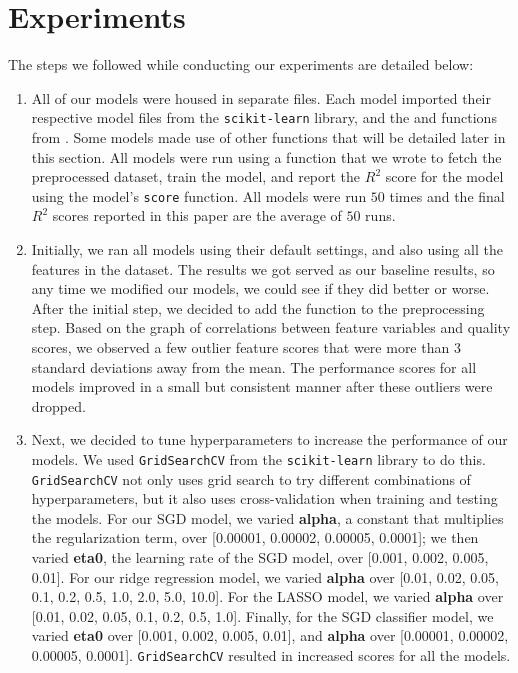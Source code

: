 
\newpage

\section{Experiments}
\label{sec:expts}

The steps we followed while conducting our experiments are detailed below:
\begin{enumerate}
    \item All of our models were housed in separate files. Each model imported their respective model files from the \texttt{scikit-learn} library, and the  and  functions from . Some models made use of other functions that will be detailed later in this section. All models were run using a  function that we wrote to fetch the preprocessed dataset, train the model, and report the $R^2$ score for the model using the model's \texttt{score} function. All models were run $50$ times and the final $R^2$ scores reported in this paper are the average of $50$ runs.
    \item Initially, we ran all models using their default settings, and also using all the features in the dataset. The results we got served as our baseline results, so any time we modified our models, we could see if they did better or worse. After the initial step, we decided to add the  function to the preprocessing step. Based on the graph of correlations between feature variables and quality scores, we observed a few outlier feature scores that were more than $3$ standard deviations away from the mean. The performance scores for all models improved in a small but consistent manner after these outliers were dropped.
    \item Next, we decided to tune hyperparameters to increase the performance of our models. We used \texttt{GridSearchCV} from the \texttt{scikit-learn} library to do this. \texttt{GridSearchCV} not only uses grid search to try different combinations of hyperparameters, but it also uses cross-validation when training and testing the models. For our SGD model, we varied \textbf{alpha}, a constant that multiplies the regularization term, over [0.00001, 0.00002, 0.00005, 0.0001]; we then varied \textbf{eta0}, the learning rate of the SGD model, over [0.001, 0.002, 0.005, 0.01]. For our ridge regression model, we varied \textbf{alpha} over [0.01, 0.02, 0.05, 0.1, 0.2, 0.5, 1.0, 2.0, 5.0, 10.0]. For the LASSO model, we varied \textbf{alpha} over [0.01, 0.02, 0.05, 0.1, 0.2, 0.5, 1.0]. Finally, for the SGD classifier model, we varied \textbf{eta0} over [0.001, 0.002, 0.005, 0.01], and \textbf{alpha} over [0.00001, 0.00002, 0.00005, 0.0001]. \texttt{GridSearchCV} resulted in increased scores for all the models.

\end{enumerate}

